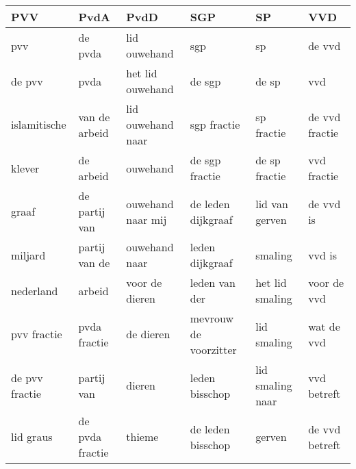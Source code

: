\begin{tabular}{llllll}
\toprule
            PVV &             PvdA &               PvdD &                    SGP &                SP &             VVD \\
\midrule
            pvv &          de pvda &       lid ouwehand &                    sgp &                sp &          de vvd \\
         de pvv &             pvda &   het lid ouwehand &                 de sgp &             de sp &             vvd \\
   islamitische &    van de arbeid &  lid ouwehand naar &            sgp fractie &        sp fractie &  de vvd fractie \\
         klever &        de arbeid &           ouwehand &         de sgp fractie &     de sp fractie &     vvd fractie \\
          graaf &    de partij van &  ouwehand naar mij &     de leden dijkgraaf &    lid van gerven &       de vvd is \\
        miljard &    partij van de &      ouwehand naar &        leden dijkgraaf &           smaling &          vvd is \\
      nederland &           arbeid &     voor de dieren &          leden van der &   het lid smaling &     voor de vvd \\
    pvv fractie &     pvda fractie &          de dieren &  mevrouw de voorzitter &       lid smaling &      wat de vvd \\
 de pvv fractie &       partij van &             dieren &         leden bisschop &  lid smaling naar &     vvd betreft \\
      lid graus &  de pvda fractie &             thieme &      de leden bisschop &            gerven &  de vvd betreft \\
\bottomrule
\end{tabular}
